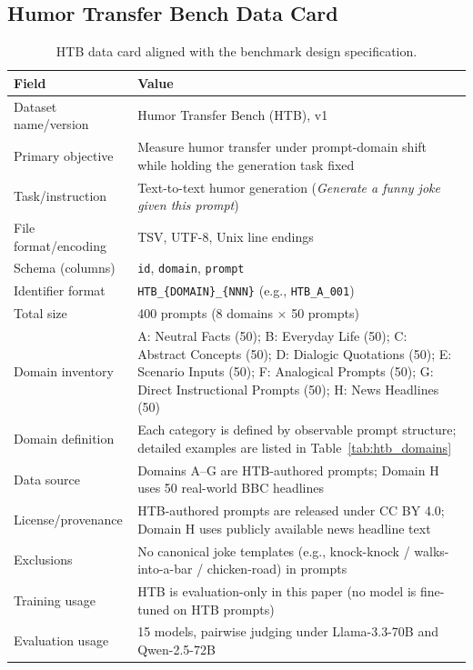 \documentclass[11pt]{article}
\begin{document}
\subsection{Humor Transfer Bench Data Card}
\begin{table}[!h]
\centering
\small
\begin{tabular}{@{}p{}p{}@{}}
\toprule
\textbf{Field} & \textbf{Value} \\
\midrule
Dataset name/version & Humor Transfer Bench (HTB), v1 \\
Primary objective & Measure humor transfer under prompt-domain shift while holding the generation task fixed \\
Task/instruction & Text-to-text humor generation (\textit{Generate a funny joke given this prompt}) \\
File format/encoding & TSV, UTF-8, Unix line endings \\
Schema (columns) & \texttt{id}, \texttt{domain}, \texttt{prompt} \\
Identifier format & \texttt{HTB\_\{DOMAIN\}\_\{NNN\}} (e.g., \texttt{HTB\_A\_001}) \\
Total size & 400 prompts (8 domains $\times$ 50 prompts) \\
Domain inventory & A: Neutral Facts (50); B: Everyday Life (50); C: Abstract Concepts (50); D: Dialogic Quotations (50); E: Scenario Inputs (50); F: Analogical Prompts (50); G: Direct Instructional Prompts (50); H: News Headlines (50) \\
Domain definition & Each category is defined by observable prompt structure; detailed examples are listed in Table~\ref{tab:htb_domains} \\
Data source & Domains A--G are HTB-authored prompts; Domain H uses 50 real-world BBC headlines \\
License/provenance & HTB-authored prompts are released under CC BY 4.0; Domain H uses publicly available news headline text \\
Exclusions & No canonical joke templates (e.g., knock-knock / walks-into-a-bar / chicken-road) in prompts \\
Training usage & HTB is evaluation-only in this paper (no model is fine-tuned on HTB prompts) \\
Evaluation usage & 15 models, pairwise judging under Llama-3.3-70B and Qwen-2.5-72B \\
\bottomrule
\end{tabular}
\caption{HTB data card aligned with the benchmark design specification.}
\label{tab:htb_data_card}
\end{table}
\end{document}
